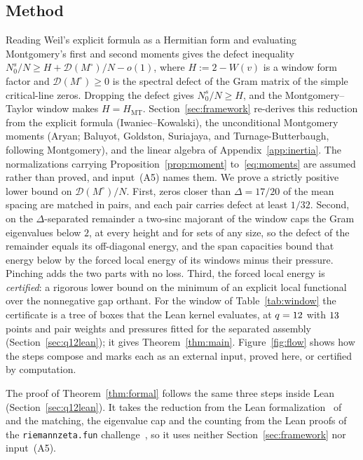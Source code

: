 \documentclass[11pt]{article}
\theoremstyle{definition}
\begin{document}
\subsection{Method}
Reading Weil's explicit formula as a Hermitian form and evaluating Montgomery's
first and second moments gives the defect inequality
$N_0^s/N\ge H+\mathcal D(M^\circ)/N-o(1)$, where $H:=2-W(v)$ is a window form
factor and $\mathcal D(M^\circ)\ge0$ is the spectral defect of the Gram matrix of
the simple critical-line zeros. Dropping the defect gives $N_0^s/N\ge H$, and the
Montgomery--Taylor window makes $H=H_{\mathrm{MT}}$.
Section~\ref{sec:framework} re-derives this reduction from the explicit formula
(Iwaniec--Kowalski), the unconditional Montgomery moments (Aryan; Baluyot,
Goldston, Suriajaya, and Turnage-Butterbaugh, following Montgomery), and the
linear algebra of Appendix~\ref{app:inertia}. The normalizations carrying
Proposition~\ref{prop:moment} to~\eqref{eq:moments} are assumed rather than
proved, and input~(A5) names them. We prove a strictly positive lower
bound on $\mathcal D(M^\circ)/N$. First, zeros closer than $\Delta=17/20$
of the mean spacing are matched in pairs, and each pair carries defect at
least $1/32$. Second, on the $\Delta$-separated remainder a two-sinc majorant
of the window caps the Gram eigenvalues below $2$, at every height and for
sets of any size, so the defect of the remainder equals its off-diagonal
energy, and the span capacities bound that energy below by the forced local
energy of its windows minus their pressure. Pinching adds the two parts with
no loss. Third, the forced local energy is \emph{certified}: a rigorous lower
bound on the minimum of an explicit local functional over the nonnegative gap
orthant. For the window of Table~\ref{tab:window} the certificate is a tree of
boxes that the Lean kernel evaluates, at $q=12$ with $13$ points and
pair weights and pressures fitted for the separated assembly
(Section~\ref{sec:q12lean}); it gives Theorem~\ref{thm:main}. Figure~\ref{fig:flow} shows how the
steps compose and marks each as an external input, proved here, or certified
by computation.

The proof of Theorem~\ref{thm:formal} follows the same three steps inside Lean
(Section~\ref{sec:q12lean}). It takes the reduction from the Lean
formalization~\cite{Zeta23Lean} of~\cite{AF26} and the matching, the
eigenvalue cap and the counting from the Lean proofs of the
\texttt{riemannzeta.fun} challenge~\cite{RZF26,Lav26}, so it uses neither
Section~\ref{sec:framework} nor input~(A5).
\end{document}
